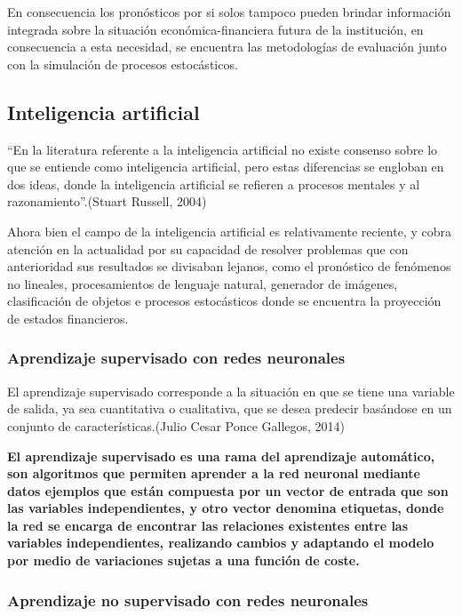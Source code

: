 \documentclass[
  12pt,
]{article}
\begin{document}
En consecuencia los pronósticos por si solos tampoco pueden brindar
información integrada sobre la situación económica-financiera futura de
la institución, en consecuencia a esta necesidad, se encuentra las
metodologías de evaluación junto con la simulación de procesos
estocásticos.

\hypertarget{inteligencia-artificial}{%
\subsection{Inteligencia artificial}\label{inteligencia-artificial}}

``En la literatura referente a la inteligencia artificial no existe
consenso sobre lo que se entiende como inteligencia artificial, pero
estas diferencias se engloban en dos ideas, donde la inteligencia
artificial se refieren a procesos mentales y al razonamiento''.(Stuart
Russell, 2004)

Ahora bien el campo de la inteligencia artificial es relativamente
reciente, y cobra atención en la actualidad por su capacidad de resolver
problemas que con anterioridad sus resultados se divisaban lejanos, como
el pronóstico de fenómenos no lineales, procesamientos de lenguaje
natural, generador de imágenes, clasificación de objetos e procesos
estocásticos donde se encuentra la proyección de estados financieros.

\hypertarget{aprendizaje-supervisado-con-redes-neuronales}{%
\subsubsection{Aprendizaje supervisado con redes
neuronales}\label{aprendizaje-supervisado-con-redes-neuronales}}

El aprendizaje supervisado corresponde a la situación en que se tiene
una variable de salida, ya sea cuantitativa o cualitativa, que se desea
predecir basándose en un conjunto de características.(Julio Cesar Ponce
Gallegos, 2014)

\textbf{El aprendizaje supervisado es una rama del aprendizaje
automático, son algoritmos que permiten aprender a la red neuronal
mediante datos ejemplos que están compuesta por un vector de entrada que
son las variables independientes, y otro vector denomina etiquetas,
donde la red se encarga de encontrar las relaciones existentes entre las
variables independientes, realizando cambios y adaptando el modelo por
medio de variaciones sujetas a una función de coste.}

\hypertarget{aprendizaje-no-supervisado-con-redes-neuronales}{%
\subsubsection{Aprendizaje no supervisado con redes
neuronales}\label{aprendizaje-no-supervisado-con-redes-neuronales}}
\end{document}
